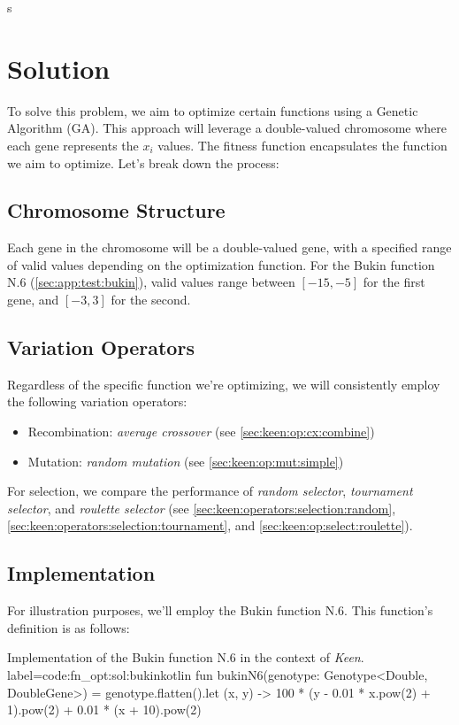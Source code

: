 s\section{Solution}
\label{sec:fn_opt:sol}
  To solve this problem, we aim to optimize certain functions using a Genetic 
  Algorithm (GA). This approach will leverage a double-valued chromosome where 
  each gene represents the \(x_i\) values. The fitness function encapsulates 
  the function we aim to optimize. Let's break down the process:

  \subsection{Chromosome Structure}
    Each gene in the chromosome will be a double-valued gene, with a specified 
    range of valid values depending on the optimization function. For the Bukin 
    function N.6 (\vref{sec:app:test:bukin}), valid values range between 
    \([-15, -5]\) for the first gene, and \([-3, 3]\) for the second.

  \subsection{Variation Operators}
    Regardless of the specific function we're optimizing, we will consistently 
    employ the following variation operators:

    \begin{itemize}
      \item Recombination: \textit{average crossover} (see 
        \vref{sec:keen:op:cx:combine})
      \item Mutation: \textit{random mutation} (see 
        \vref{sec:keen:op:mut:simple})
    \end{itemize}

    For selection, we compare the performance of \textit{random selector}, 
    \textit{tournament selector}, and \textit{roulette selector} (see 
    \vref{sec:keen:operators:selection:random}, 
    \vref{sec:keen:operators:selection:tournament}, and 
    \vref{sec:keen:op:select:roulette}).

  \subsection{Implementation}
    For illustration purposes, we'll employ the Bukin function N.6. This 
    function's definition is as follows:

    \begin{code}{
      Implementation of the Bukin function N.6 in the context of \textit{Keen}.
    }{label=code:fn_opt:sol:bukin}{kotlin}
      fun bukinN6(genotype: Genotype<Double, DoubleGene>) = genotype.flatten().let { (x, y) ->
          100 * (y - 0.01 * x.pow(2) + 1).pow(2) + 0.01 * (x + 10).pow(2)
      }
    \end{code}

